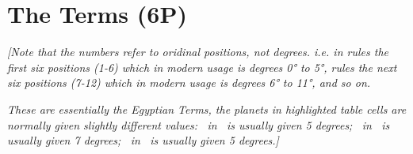 \section{The Terms (6P)}

\textit{[Note that the numbers refer to oridinal positions, not degrees. i.e. \Jupiter\xspace in \Aries rules the first six positions (1-6) which in modern usage is  degrees 0° to 5°, \Venus\xspace rules the next six positions (7-12) which in modern usage is degrees 6° to 11°, and so on. }

\textit{These are essentially the Egyptian Terms, the planets in highlighted table cells are normally given slightly different values: \Saturn\, in \Taurus\, is usually given 5 degrees; \Jupiter\, in \Libra\, is usually given 7 degrees; \Mars\, in \Aquarius\, is usually given 5 degrees.]}

